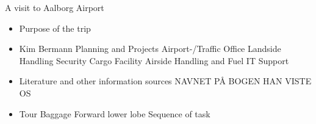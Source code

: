 A visit to Aalborg Airport 

\begin{itemize}
\item Purpose of the trip
\item Kim Bermann
\subitem Planning and Projects
\subitem Airport-/Traffic Office
\subitem Landside Handling
\subitem Security
\subitem Cargo
\subitem Facility
\subitem Airside Handling and Fuel
\subitem IT Support
\item Literature and other information sources
\subitem NAVNET PÅ BOGEN HAN VISTE OS
\item Tour
\subitem Baggage 
\subitem Forward lower lobe
\subitem Sequence of task
\end{itemize}